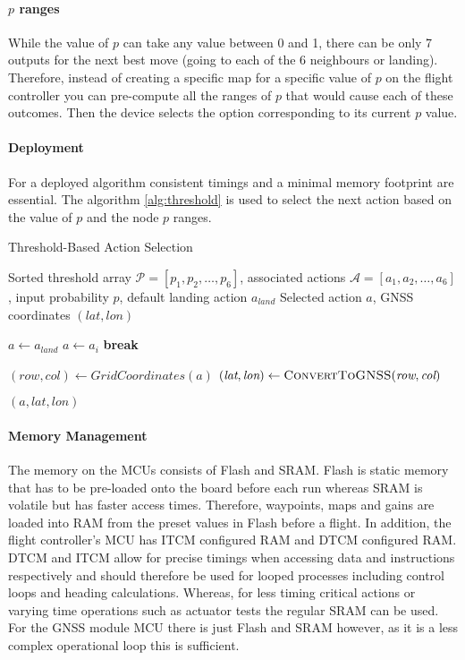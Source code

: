 \paragraph{$p$ ranges}
While the value of $p$ can take any value between 0 and 1, there can be only 7 outputs for the next best move (going to each of the 6 neighbours or landing). Therefore, instead of creating a specific map for a specific value of $p$ on the flight controller you can pre-compute all the ranges of $p$ that would cause each of these outcomes. Then the device selects the option corresponding to its current $p$ value.
\paragraph{Deployment}
For a deployed algorithm consistent timings and a minimal memory footprint are essential. The algorithm \ref{alg:threshold} is used to select the next action based on the value of $p$ and the node $p$ ranges.
\begin{algorithm}[htbp]
  \caption{Threshold-Based Action Selection}
  \label{alg:threshold}
  \begin{algorithmic}[1]
    \Require Sorted threshold array \(\mathcal{P} = [p_1, p_2, \dots, p_6]\), associated actions \(\mathcal{A} = [a_1, a_2, \dots, a_6]\), input probability \(p\), default landing action \(a_{\textit{land}}\)
    \Ensure Selected action \(a\), GNSS coordinates \((\textit{lat}, \textit{lon})\)
    
    \State \(a \gets a_{\textit{land}}\) 
        \State \(a \gets a_i\)
        \State \textbf{break}
      \EndIf
    \EndFor
    
    \State \((\textit{row}, \textit{col}) \gets \textit{GridCoordinates}(a)\)
    \State \((\textit{lat}, \textit{lon}) \gets \Call{ConvertToGNSS}{\textit{row}, \textit{col}}\)
    
    \State \Return \((a, \textit{lat}, \textit{lon})\)
  \end{algorithmic}
\end{algorithm}
\paragraph{Memory Management}
The memory on the \gls{MCU}s consists of Flash and \gls{SRAM}. Flash is static memory that has to be pre-loaded onto the board before each run whereas \gls{SRAM} is volatile but has faster access times. Therefore, waypoints, maps and gains are loaded into \gls{RAM} from the preset values in Flash before a flight. In addition, the flight controller's \gls{MCU} has \gls{ITCM} configured \gls{RAM} and \gls{DTCM} configured \gls{RAM}. \gls{DTCM} and \gls{ITCM} allow for precise timings when accessing data and instructions respectively and should therefore be used for looped processes including control loops and heading calculations. Whereas, for less timing critical actions or varying time operations such as actuator tests the regular \gls{SRAM} can be used. For the \gls{GNSS} module \gls{MCU} there is just Flash and \gls{SRAM} however, as it is a less complex operational loop this is sufficient. 

